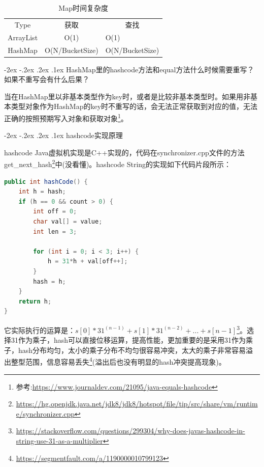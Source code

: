 \documentclass[8pt]{book}
\makeatletter
\numberwithin{dummy}{section}
\theoremstyle{ocrenumbox}
\theoremstyle{blacknumex}
\theoremstyle{blacknumbox}
\theoremstyle{ocrenum}
\renewcommand\paragraph{\@startsection{paragraph}{4}{\z@}
	{-2ex \@plus-.2ex \@minus .2ex}
	{.1ex}
	{\normalfont\small\sffamily\bfseries}}
\makeatother
\begin{document}
\begin{table}[htbp]
	\caption{Map时间复杂度}
	\label{table:mapo}
	\begin{center}
		\begin{tabular}{|c|c|p{5cm}|}
			\hline
			\multirow{1}{*}{Type}
			& \multicolumn{1}{c|}{获取} 
			& \multicolumn{1}{c|}{查找}\\			
			\cline{1-3}
			ArrayList &  O(1)  &  O(1) \\
			\hline
			HashMap &  O(N/BucketSize)  & O(N/BucketSize)  \\
			\hline							
		\end{tabular}	
	\end{center}
\end{table}



\paragraph{HashMap里的hashcode方法和equal方法什么时候需要重写？如果不重写会有什么后果？}

当在HashMap里以非基本类型作为key时，或者是比较非基本类型时。如果用非基本类型对象作为HashMap的key时不重写的话，会无法正常获取到对应的值，无法正确的按照预期写入对象和获取对象\footnote{参考:\url{https://www.journaldev.com/21095/java-equals-hashcode}}。

\paragraph{hashcode实现原理}


hashcode Java虚拟机实现是C++实现的，代码在synchronizer.cpp文件的方法get\_next\_hash\footnote{\url{https://hg.openjdk.java.net/jdk8/jdk8/hotspot/file/tip/src/share/vm/runtime/synchronizer.cpp}}中(没看懂)。hashcode String的实现如下代码片段所示：

\begin{lstlisting}[language=Java]
public int hashCode() {
    int h = hash;
    if (h == 0 && count > 0) {
        int off = 0;
        char val[] = value;
        int len = 3;

        for (int i = 0; i < 3; i++) {
            h = 31*h + val[off++];
        }
        hash = h;
    }
    return h;
}
\end{lstlisting}



它实际执行的运算是：$s[0]*31^{(n-1)} + s[1]*31^{(n-2)} + ... + s[n-1]$\footnote{\url{https://stackoverflow.com/questions/299304/why-does-javas-hashcode-in-string-use-31-as-a-multiplier}}。选择31作为乘子，hash可以直接位移运算，提高性能，更加重要的是采用31作为乘子，hash分布均匀，太小的乘子分布不均匀很容易冲突，太大的乘子非常容易溢出整型范围，信息容易丢失\footnote{\url{https://segmentfault.com/a/1190000010799123}}(溢出后也没有明显的hash冲突提高现象)。
\end{document}
